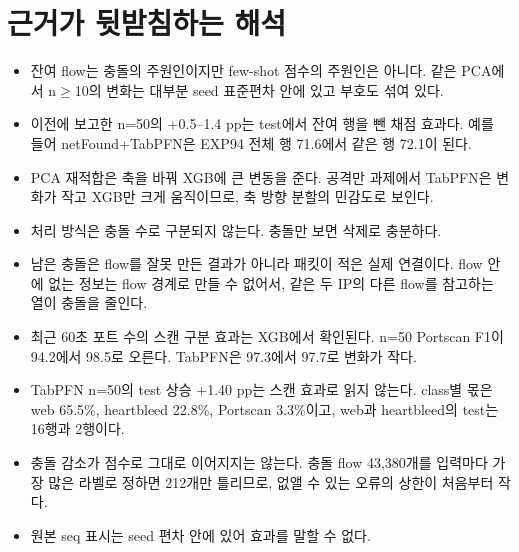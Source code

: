 \section{근거가 뒷받침하는 해석}
\begin{itemize}
\item 잔여 flow는 충돌의 주원인이지만 few-shot 점수의 주원인은 아니다. 같은 PCA에서 n$\ge$10의 변화는 대부분 seed 표준편차 안에 있고 부호도 섞여 있다.
\item 이전에 보고한 n=50의 +0.5--1.4 pp는 test에서 잔여 행을 뺀 채점 효과다. 예를 들어 netFound+TabPFN은 EXP94 전체 행 71.6에서 같은 행 72.1이 된다.
\item PCA 재적합은 축을 바꿔 XGB에 큰 변동을 준다. 공격만 과제에서 TabPFN은 변화가 작고 XGB만 크게 움직이므로, 축 방향 분할의 민감도로 보인다.
\item 처리 방식은 충돌 수로 구분되지 않는다. 충돌만 보면 삭제로 충분하다.
\item 남은 충돌은 flow를 잘못 만든 결과가 아니라 패킷이 적은 실제 연결이다. flow 안에 없는 정보는 flow 경계로 만들 수 없어서, 같은 두 IP의 다른 flow를 참고하는 열이 충돌을 줄인다.
\item 최근 60초 포트 수의 스캔 구분 효과는 XGB에서 확인된다. n=50 Portscan F1이 94.2에서 98.5로 오른다. TabPFN은 97.3에서 97.7로 변화가 작다.
\item TabPFN n=50의 test 상승 +1.40 pp는 스캔 효과로 읽지 않는다. class별 몫은 web 65.5\%, heartbleed 22.8\%, Portscan 3.3\%이고, web과 heartbleed의 test는 16행과 2행이다.
\item 충돌 감소가 점수로 그대로 이어지지는 않는다. 충돌 flow 43,380개를 입력마다 가장 많은 라벨로 정하면 212개만 틀리므로, 없앨 수 있는 오류의 상한이 처음부터 작다.
\item 원본 seq 표시는 seed 편차 안에 있어 효과를 말할 수 없다.
\end{itemize}


